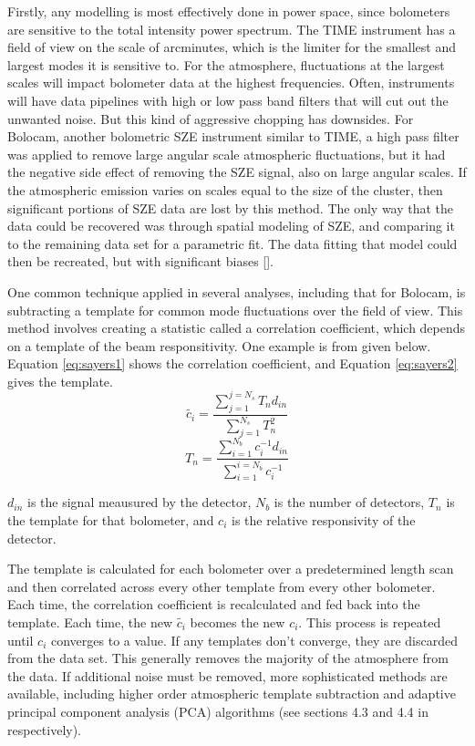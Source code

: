 \documentclass[manuscript]{aastex}
\begin{document}
Firstly, any modelling is most effectively done in power space, since bolometers are sensitive to the total intensity power spectrum. The TIME instrument has a field of view on the scale of arcminutes, which is the limiter for the smallest and largest modes it is sensitive to. For the atmosphere, fluctuations at the largest scales will impact bolometer data at the highest frequencies. Often, instruments will have data pipelines with high or low pass band filters that will cut out the unwanted noise. But this kind of aggressive chopping has downsides. For Bolocam, another bolometric SZE instrument similar to TIME, a high pass filter was applied to remove large angular scale atmospheric fluctuations, but it had the negative side effect of removing the SZE signal, also on large angular scales. If the atmospheric emission varies on scales equal to the size of the cluster, then significant portions of SZE data are lost by this method. The only way that the data could be recovered was through spatial modeling of SZE, and comparing it to the remaining data set for a parametric fit. The data fitting that model could then be recreated, but with significant biases [\cite{Sayers2013}].

One common technique applied in several analyses, including that for Bolocam, is subtracting a template for common mode fluctuations over the field of view. This method involves creating a statistic called a correlation coefficient, which depends on a template of the beam responsitivity. One example is from \cite{Sayers2010} given below. Equation \ref{eq:sayers1} shows the correlation coefficient, and Equation \ref{eq:sayers2} gives the template.
\begin{equation}\label{eq:sayers1}
    \tilde{c_{i}} = \frac{\sum_{j=1}^{j=N_{s}} T_{n}d_{in}}{\sum_{j=1}^{N_{s}} T_{n}^{2}}
\end{equation}
\begin{equation}\label{eq:sayers2}
    T_{n} = \frac{\sum_{i=1}^{N_{b}} c_{i}^{-1} d_{in}}{\sum_{i=1}^{i=N_{b}} c_{i}^{-1}}
\end{equation}

$d_{in}$ is the signal meausured by the detector, $N_{b}$ is the number of detectors, $T_{n}$ is the template for that bolometer, and $c_{i}$ is the relative responsivity of the detector.

The template is calculated for each bolometer over a predetermined length scan and then correlated across every other template from every other bolometer. Each time, the correlation coefficient is recalculated and fed back into the template. Each time, the new $\tilde{c_{i}}$ becomes the new $c_{i}$. This process is repeated until $c_{i}$ converges to a value. If any templates don't converge, they are discarded from the data set. This generally removes the majority of the atmosphere from the data. If additional noise must be removed, more sophisticated methods are available, including higher order atmospheric template subtraction and adaptive principal component analysis (PCA) algorithms (see sections 4.3 and 4.4 in \cite{Sayers2010} respectively).
\end{document}
